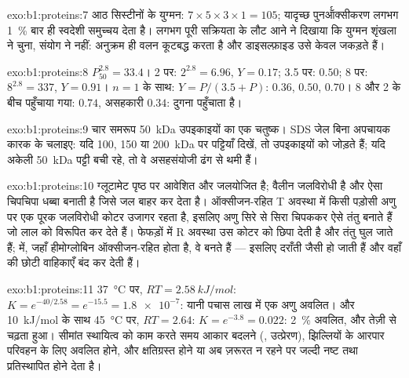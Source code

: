\begin{solution}{exo:b1:proteins:7}
आठ सिस्टीनों के युग्मन: $7\times 5\times 3\times 1 = 105$; यादृच्छ
पुनर्ऑक्सीकरण लगभग \qty{1}{\%} बार ही स्वदेशी समुच्चय देता है।
लगभग पूरी सक्रियता के लौट आने ने दिखाया कि युग्मन शृंखला ने चुना, संयोग ने
नहीं: अनुक्रम ही वलन कूटबद्ध करता है और डाइसल्फ़ाइड उसे केवल जकड़ते हैं।
\end{solution}

\begin{solution}{exo:b1:proteins:8}
$P_{50}^{2.8} = 33.4$। 2 पर: $2^{2.8} = 6.96$, $Y = 0.17$; 3.5 पर:
$0.50$; 8 पर: $8^{2.8} = 337$, $Y = 0.91$। $n = 1$ के साथ: $Y =
P/(3.5 + P)$: $0.36$, $0.50$, $0.70$। 8 और 2 के बीच पहुँचाया गया:
 $0.74$, असहकारी $0.34$:   दुगना पहुँचाता है।
\end{solution}

\begin{solution}{exo:b1:proteins:9}
चार समरूप \qty{50}{kDa} उपइकाइयों का एक चतुष्क। SDS जेल बिना अपचायक
कारक के चलाइए: यदि 100, 150 या \qty{200}{kDa} पर पट्टियाँ दिखें, तो
 उपइकाइयों को जोड़ते हैं; यदि अकेली \qty{50}{kDa} पट्टी
बची रहे, तो वे असहसंयोजी ढंग से थमी हैं।
\end{solution}

\begin{solution}{exo:b1:proteins:10}
ग्लूटामेट पृष्ठ पर आवेशित और जलयोजित है; वैलीन
जलविरोधी है और ऐसा चिपचिपा धब्बा बनाती है जिसे जल बाहर कर देता है।
ऑक्सीजन-रहित T अवस्था में किसी पड़ोसी अणु पर एक पूरक जलविरोधी कोटर उजागर
रहता है, इसलिए अणु सिरे से सिरा चिपककर ऐसे तंतु बनाते हैं जो लाल 
को विरूपित कर देते हैं। फेफड़ों में R अवस्था उस कोटर को छिपा देती है और
तंतु घुल जाते हैं;  में, जहाँ हीमोग्लोबिन ऑक्सीजन-रहित होता है, वे
बनते हैं --- इसलिए  दराँती जैसी हो जाती हैं और वहाँ की छोटी
वाहिकाएँ बंद कर देती हैं।
\end{solution}

\begin{solution}{exo:b1:proteins:11}
\qty{37}{\celsius} पर, $RT = \qty{2.58}{kJ/mol}$: $K = e^{-40/2.58} =
e^{-15.5} = \num{1.8e-7}$: यानी पचास लाख में एक अणु अवलित। और
\qty{10}{kJ/mol} के साथ \qty{45}{\celsius} पर, $RT = 2.64$: $K = e^{-3.8} =
0.022$: \qty{2}{\%} अवलित, और तेज़ी से चढ़ता हुआ। सीमांत स्थायित्व
 को काम करते समय आकार बदलने (, उत्प्रेरण),
झिल्लियों के आरपार परिवहन के लिए अवलित होने, और क्षतिग्रस्त होने या अब
ज़रूरत न रहने पर जल्दी नष्ट तथा प्रतिस्थापित होने देता है।
\end{solution}

